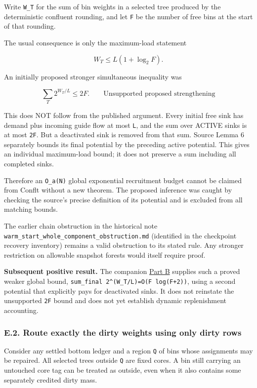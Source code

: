 Write \texttt{W\_T} for the sum of bin weights in a selected tree produced by the deterministic confluent rounding, and let \texttt{F} be the number of free bins at the start of that rounding.

The usual consequence is only the maximum-load statement

\[
W_T\le L(1+\log_2F).
\]

An initially proposed stronger simultaneous inequality was

\[
\sum_T2^{W_T/L}\le2F.\qquad\text{Unsupported proposed strengthening}
\]

This does NOT follow from the published argument. Every initial free sink has demand plus incoming guide flow at most \texttt{L}, and the sum over ACTIVE sinks is at most \texttt{2F}. But a deactivated sink is removed from that sum. Source Lemma 6 separately bounds its final potential by the preceding active potential. This gives an individual maximum-load bound; it does not preserve a sum including all completed sinks.

Therefore an \texttt{O\_a(N)} global exponential recruitment budget cannot be claimed from Conflt without a new theorem. The proposed inference was caught by checking the source's precise definition of its potential and is excluded from all matching bounds.

The earlier chain obstruction in the historical note \texttt{warm\_start\_whole\_component\_obstruction.md} (identified in the checkpoint recovery inventory) remains a valid obstruction to its stated rule. Any stronger restriction on allowable snapshot forests would itself require proof.

\textbf{Subsequent positive result.} The companion \protect\hyperlink{af-385fd70686-exponential-moment}{Part B} supplies such a proved weaker global bound, \texttt{sum\_final\ 2\^{}(W\_T/L)=O(F\ log(F+2))}, using a second potential that explicitly pays for deactivated sinks. It does not reinstate the unsupported \texttt{2F} bound and does not yet establish dynamic replenishment accounting.

\hypertarget{af-385fd70686-e.2.-route-exactly-the-dirty-weights-using-only-dirty-rows}{%
\subsubsection{E.2. Route exactly the dirty weights using only dirty rows}\label{af-385fd70686-e.2.-route-exactly-the-dirty-weights-using-only-dirty-rows}}

Consider any settled bottom ledger and a region \texttt{Q} of bins whose assignments may be repaired. All selected trees outside \texttt{Q} are fixed cores. A bin still carrying an untouched core tag can be treated as outside, even when it also contains some separately credited dirty mass.

